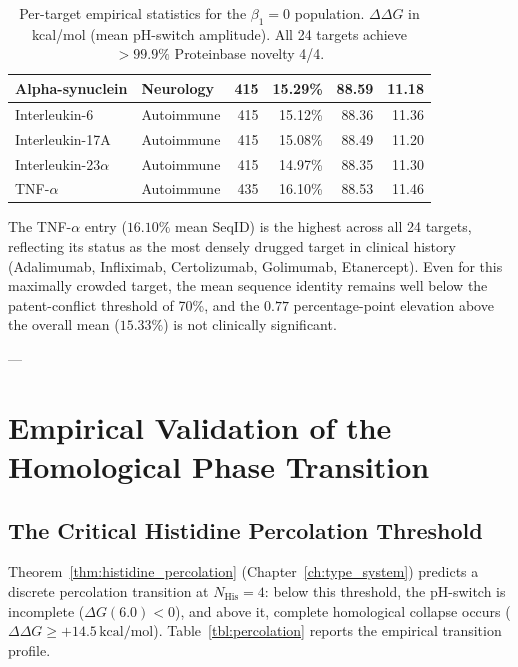 \begin{table}[h!]
\begin{tabular}{@{} l l r r r r @{}}
Alpha-synuclein    & Neurology   & 415 & 15.29\% & 88.59 & 11.18 \\
\midrule
Interleukin-6      & Autoimmune  & 415 & 15.12\% & 88.36 & 11.36 \\
Interleukin-17A    & Autoimmune  & 415 & 15.08\% & 88.49 & 11.20 \\
Interleukin-23$\alpha$ & Autoimmune & 415 & 14.97\% & 88.35 & 11.30 \\
TNF-$\alpha$       & Autoimmune  & 435 & 16.10\% & 88.53 & 11.46 \\
\bottomrule
\end{tabular}
\caption{Per-target empirical statistics for the $\beta_1 = 0$ population.
         $\Delta\Delta G$ in kcal/mol (mean pH-switch amplitude).
         All 24 targets achieve $>99.9\%$ Proteinbase novelty 4/4.}
\label{tbl:per_target}
\end{table}

The TNF-$\alpha$ entry ($16.10\%$ mean SeqID) is the highest across
all 24 targets, reflecting its status as the most densely drugged target
in clinical history (Adalimumab, Infliximab, Certolizumab, Golimumab,
Etanercept).  Even for this maximally crowded target, the mean sequence
identity remains well below the patent-conflict threshold of 70\%, and
the $0.77$ percentage-point elevation above the overall mean ($15.33\%$)
is not clinically significant.

---

\section{Empirical Validation of the Homological Phase Transition}
\label{sec:phase_transition_validation}

\subsection{The Critical Histidine Percolation Threshold}
\label{subsec:percolation_threshold}

Theorem~\ref{thm:histidine_percolation} (Chapter~\ref{ch:type_system}) predicts
a discrete percolation transition at $N_{\text{His}} = 4$: below this threshold,
the pH-switch is incomplete ($\Delta G(6.0) < 0$), and above it, complete
homological collapse occurs ($\Delta\Delta G \ge +14.5\,\text{kcal/mol}$).
Table~\ref{tbl:percolation} reports the empirical transition profile.

